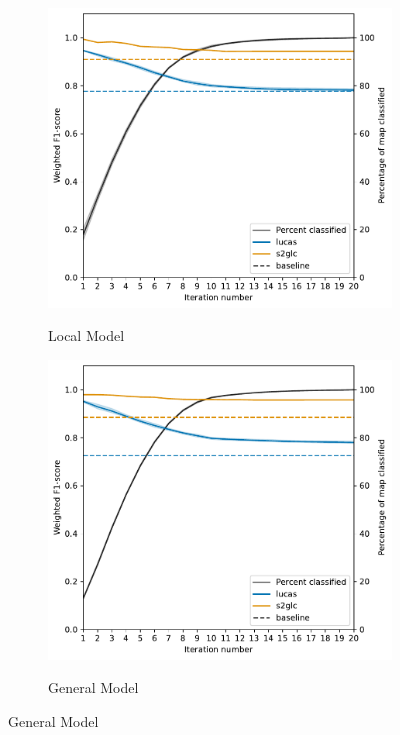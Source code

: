         \begin{figure}
            \centering
            \begin{subfigure}[b]{0.75\textwidth}
            \centering
            \caption{Local Model}\includegraphics[width=\textwidth]{figs_04/fig12a_f1_during_filling_local.pdf}
            \label{fig:f1_filling_local}
            \hspace{-0.9em}
            
            \end{subfigure}
            
            \begin{subfigure}[b]{0.75\textwidth}
           \centering
           \caption{General Model}
           \includegraphics[width=\textwidth]{figs_04/fig12b_f1_during_filling_general.pdf}
           \label{fig:f1_filling_general}
           

\end{subfigure}
\end{figure}

